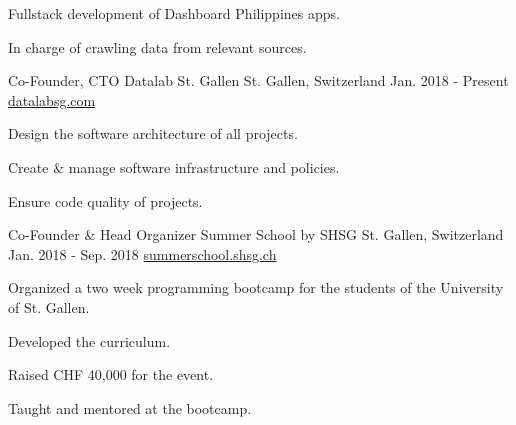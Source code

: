 \begin{cventries}
{\begin{cvitems}
      \item {Fullstack development of Dashboard Philippines apps.}
      \item {In charge of crawling data from relevant sources.}
      \end{cvitems}
    }
  \cventry
    {Co-Founder, CTO} %
    {Datalab St. Gallen} %
    {St. Gallen, Switzerland} %
    {Jan. 2018 - Present} %
    {\href{https://datalabsg.com}{datalabsg.com}} %
    {
      \begin{cvitems} %
      \item {Design the software architecture of all projects.}
      \item {Create \& manage software infrastructure and policies.}
      \item {Ensure code quality of projects.}
      \end{cvitems}
    }
  \cventry
    {Co-Founder \& Head Organizer} %
    {Summer School by SHSG} %
    {St. Gallen, Switzerland} %
    {Jan. 2018 - Sep. 2018} %
    {\href{https://summerschool.shsg.ch}{summerschool.shsg.ch}} %
    {
      \begin{cvitems} %
      \item {Organized a two week programming bootcamp for the students of the University of St. Gallen.}
      \item {Developed the curriculum.}
      \item {Raised CHF 40,000 for the event.}
      \item {Taught and mentored at the bootcamp.}
      \end{cvitems}
    }


\end{cventries}
